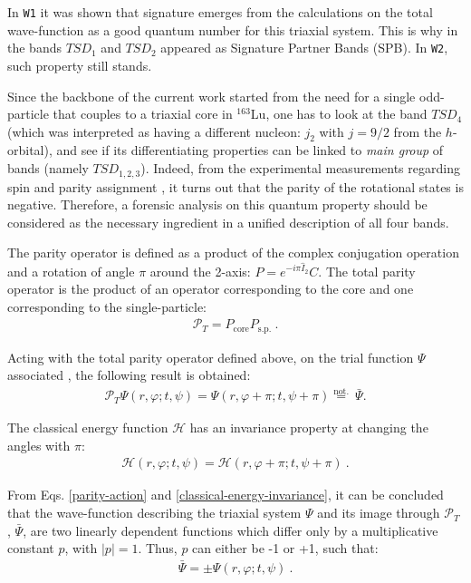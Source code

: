 \documentclass[myclassdoc,debug]{rjparticle}
\begin{document}
In \texttt{W1} it was shown that signature emerges from the calculations on the total wave-function as a good quantum number for this triaxial system. This is why in \cite{raduta2020approach} the bands $TSD_1$ and $TSD_2$ appeared as Signature Partner Bands (SPB). In \texttt{W2}, such property still stands.

Since the backbone of the current work started from the need for a single odd-particle that couples to a triaxial core in $^{163}$Lu, one has to look at the band $TSD_4$ (which was interpreted as having a different nucleon: $j_2$ with $j=9/2$ from the $h$-orbital), and see if its differentiating properties can be linked to \emph{main group} of bands (namely $TSD_{1,2,3}$). Indeed, from the experimental measurements regarding spin and parity assignment \cite{jensen2004coexisting}, it turns out that the parity of the rotational states is negative. Therefore, a forensic analysis on this quantum property should be considered as the necessary ingredient in a unified description of all four bands.

 The parity operator is defined as a product of the complex conjugation operation and a rotation of angle $\pi$ around the 2-axis: $P=e^{-i\pi\hat{I}_2}C$. The total parity operator is the product of an operator corresponding to the core and one corresponding to the single-particle:
\begin{align}
    \mathcal{P}_T=P_\text{core}P_\text{s.p.}\ .
    \label{parity-operator}
\end{align}

Acting with the total parity operator defined above, on the trial function $\Psi$ associated , the following result is obtained:
\begin{align}
    \mathcal{P}_T\Psi(r,\varphi;t,\psi)=\Psi(r,\varphi+\pi;t,\psi+\pi)\overset{\mathrm{not.}}{=}\ \bar{\Psi}.
    \label{parity-action}
\end{align}

The classical energy function $\mathcal{H}$ has an invariance property at changing the angles with $\pi$:
\begin{align}
    \mathcal{H}(r,\varphi;t,\psi)=\mathcal{H}(r,\varphi+\pi;t,\psi+\pi)\ .
    \label{classical-energy-invariance}
\end{align}

From Eqs. \ref{parity-action} and \ref{classical-energy-invariance}, it can be concluded that the wave-function describing the triaxial system $\Psi$ and its image through $\mathcal{P}_T$ , $\bar{\Psi}$,  are two linearly dependent functions which differ only by a multiplicative constant $p$, with $|p|=1$. Thus, $p$ can either be -1 or +1, such that:
\begin{align}
    \bar{\Psi}=\pm\Psi(r,\varphi;t,\psi)\ .
\end{align}
\end{document}

